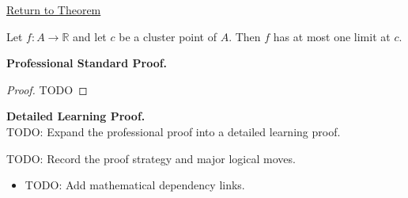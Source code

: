 \newpage
{}
\label{prf:limit-unique}

\begin{remark*}[Return]
\hyperref[thm:limit-unique]{Return to Theorem}
\end{remark*}

\begin{theorem*}
Let $f : A \to \mathbb{R}$ and let $c$ be a cluster point of $A$. Then $f$ has at most one limit at $c$.
\end{theorem*}

\textbf{Professional Standard Proof.}~\\
\begin{proof}
TODO
\end{proof}

\textbf{Detailed Learning Proof.}~\\
TODO: Expand the professional proof into a detailed learning proof.

\begin{remark*}
TODO: Record the proof strategy and major logical moves.
\end{remark*}

\begin{dependencies}
\begin{itemize}
  \item TODO: Add mathematical dependency links.
\end{itemize}
\end{dependencies}
